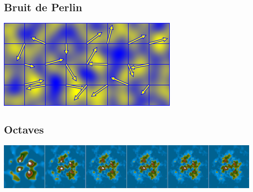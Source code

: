 \documentclass[a4paper, 10pt]{article}
\begin{document}
\begin{center}
\section*{Bruit de Perlin}
\includegraphics[scale=1]{PerlinNoise.png} 
\end{center}
\begin{center}
\section*{Octaves} 
\end{center}
\begin{flushleft}
\includegraphics[scale=0.35]{../Rapport/Octaves.jpg} 
\end{flushleft}
\end{document}
